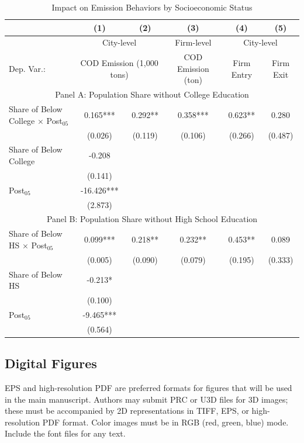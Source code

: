 \documentclass[9pt,twocolumn,twoside]{pnas-new}
\begin{document}
\begin{table}[t!]
\centering
\caption{Impact on Emission Behaviors by Socioeconomic Status}
\begin{tabular*}{\textwidth}{@{\extracolsep{\fill}}lccccc@{}}
& (1) & (2) & (3) & (4) & (5) \\
\midrule
 & \multicolumn{2}{c}{City-level} & Firm-level & \multicolumn{2}{c}{City-level} \\
Dep. Var.: & \multicolumn{2}{c}{COD Emission (1,000 tons)} & COD Emission (ton) & Firm Entry & Firm Exit \\
\multicolumn{6}{c}{Panel A: Population Share without College Education} \\
Share of Below College $\times$ Post$_{05}$ & 0.165*** & 0.292** & 0.358*** & 0.623** & 0.280 \\
 & (0.026) & (0.119) & (0.106) & (0.266) & (0.487) \\
Share of Below College & -0.208 & & & & \\
 & (0.141) & & & & \\
Post$_{05}$ & -16.426*** & & & & \\
 & (2.873) & & & & \\
\multicolumn{6}{c}{Panel B: Population Share without High School Education} \\
Share of Below HS $\times$ Post$_{05}$ & 0.099*** & 0.218** & 0.232** & 0.453** & 0.089 \\
 & (0.005) & (0.090) & (0.079) & (0.195) & (0.333) \\
Share of Below HS & -0.213* & & & & \\
 & (0.100) & & & & \\
Post$_{05}$ & -9.465*** & & & & \\
 & (0.564) & & & & \\
\bottomrule
\end{tabular*}

\end{table}

\subsection*{Digital Figures}

EPS and high-resolution PDF are preferred formats for figures that will be used in the main manuscript. Authors may submit PRC or U3D files for 3D images; these must be accompanied by 2D representations in TIFF, EPS, or high-resolution PDF format. Color images must be in RGB (red, green, blue) mode. Include the font files for any text.
\end{document}
